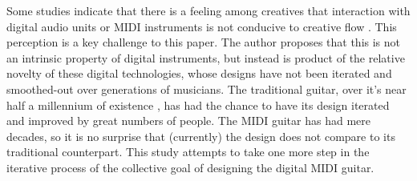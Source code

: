 Some studies indicate that there is a feeling among creatives that interaction with digital audio units or MIDI instruments is not conducive to creative flow \citep{martelloni_percussive_2020}. This perception is a key challenge to this paper. The author proposes that this is not an intrinsic property of digital instruments, but instead is product of the relative novelty of these digital technologies, whose designs have not been iterated and smoothed-out over generations of musicians. The traditional guitar, over it's near half a millennium of existence \citep{tyler_renaissance_1975}, has had the chance to have its design iterated and improved by great numbers of people. The MIDI guitar has had mere decades, so it is no surprise that (currently) the design does not compare to its traditional counterpart. This study attempts to take one more step in the iterative process of the collective goal of designing the digital MIDI guitar. 

































